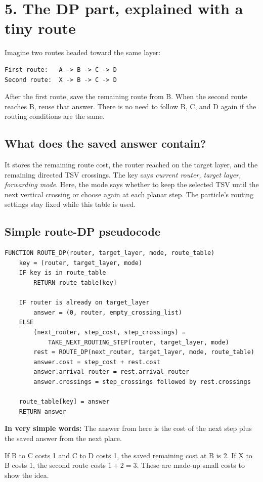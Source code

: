 \documentclass[11pt,a4paper]{article}
\newcommand{\simple}[1]{\textbf{In very simple words:} #1}
\begin{document}
\clearpage
\section*{5. The DP part, explained with a tiny route}
Imagine two routes headed toward the same layer:
\begin{lstlisting}
First route:   A -> B -> C -> D
Second route:  X -> B -> C -> D
\end{lstlisting}
After the first route, save the remaining route from B. When the second
route reaches B, reuse that answer. There is no need to follow B, C, and D
again if the routing conditions are the same.

\subsection*{What does the saved answer contain?}
It stores the remaining route cost, the router reached on the target layer,
and the remaining directed TSV crossings. The key says \emph{current router,
target layer, forwarding mode}. Here, the mode says whether to keep the
selected TSV until the next vertical crossing or choose again at each
planar step. The particle's routing settings stay fixed while this table
is used.

\subsection*{Simple route-DP pseudocode}
\begin{lstlisting}
FUNCTION ROUTE_DP(router, target_layer, mode, route_table)
    key = (router, target_layer, mode)
    IF key is in route_table
        RETURN route_table[key]

    IF router is already on target_layer
        answer = (0, router, empty_crossing_list)
    ELSE
        (next_router, step_cost, step_crossings) =
            TAKE_NEXT_ROUTING_STEP(router, target_layer, mode)
        rest = ROUTE_DP(next_router, target_layer, mode, route_table)
        answer.cost = step_cost + rest.cost
        answer.arrival_router = rest.arrival_router
        answer.crossings = step_crossings followed by rest.crossings

    route_table[key] = answer
    RETURN answer
\end{lstlisting}

\simple{The answer from here is the cost of the next step plus the saved
answer from the next place.}

If B to C costs 1 and C to D costs 1, the saved remaining cost at B is 2.
If X to B costs 1, the second route costs $1+2=3$. These are made-up small
costs to show the idea.
\end{document}
